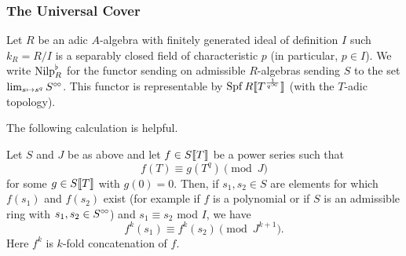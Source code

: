 \documentclass[../main.tex]{subfiles}
\begin{document}
\subsubsection{The Universal Cover} %
\label{ssub:The Universal Cover}


Let $R$ be an adic $A$-algebra with finitely generated ideal of definition $I$ such
$k_R = R/I$ is a separably closed field of characteristic $p$ (in particular, $p \in I$). 
We write ${\mathrm{Nilp}}^\flat_R$ for the functor sending on admissible $R$-algebras sending
$S$ to the set $\lim_{s \mapsto s^q} S^{\circ \hspace{-0.5pt} \circ}$. This functor is representable by
$\operatorname{Spf} R\llbracket T^{\frac 1{q^\infty}} \rrbracket$ (with the $T$-adic topology).

The following calculation is helpful.
\begin{cor}\label{cor:crystildecalc}
  Let $S$ and $J$ be as above and let $f \in S \llbracket T \rrbracket$ be a power series such
  that 
  \begin{equation*}
    f(T) \equiv g(T^{q}) \pmod J
  \end{equation*}
  for some $g \in S\llbracket T \rrbracket$ with $g(0) = 0$. Then, if $s_1, s_2 \in S$
  are elements for which $f(s_1)$ and $f(s_2)$ exist (for example if $f$ is a
  polynomial or if $S$ is an admissible ring with $s_1, s_2 \in S^{\circ \hspace{-0.5pt} \circ}$) and
  $s_1 \equiv s_2$ mod $I$, we have
  \begin{equation*}
    f^k(s_1) \equiv f^k(s_2) \pmod {J^{k+1}}.
  \end{equation*}
  Here $f^k$ is $k$-fold concatenation of $f$. 
\end{cor}
\end{document}
